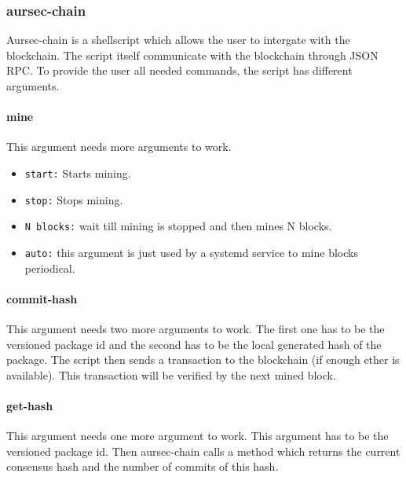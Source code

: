  \subsubsection{aursec-chain}\label{sec:aursec-chain}
Aursec-chain is a shellscript which allows the user to intergate with the blockchain. The script itself communicate with the blockchain through JSON RPC. To provide the user all needed commands, the script has different arguments.

\paragraph*{mine}
This argument needs more arguments to work.
\begin{itemize}
	\item \texttt{start:} Starts mining.
	\item \texttt{stop:} Stops mining.
	\item \texttt{N blocks:} wait till mining is stopped and then mines N blocks.
	\item \texttt{auto:} this argument is just used by a systemd service to mine blocks periodical.
\end{itemize}

\paragraph*{commit-hash}
This argument needs two more arguments to work. The first one has to be the versioned package id and the second has to be the local generated hash of the package. The script then sends a transaction to the blockchain (if enough ether is available). This transaction will be verified by the next mined block.

\paragraph*{get-hash}
This argument needs one more argument to work. This argument has to be the versioned package id. Then aursec-chain calls a method which returns the current consensus hash and the number of commits of this hash. 
